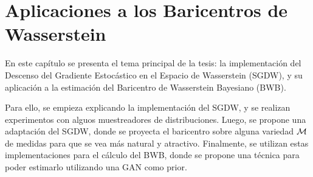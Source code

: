 \chapter{Aplicaciones a los Baricentros de Wasserstein}

En este capítulo se presenta el tema principal de la tesis: la implementación del Descenso del Gradiente Estocástico en el Espacio de Wasserstein (SGDW), y su aplicación a la estimación del Baricentro de Wasserstein Bayesiano (BWB).

Para ello, se empieza explicando la implementación del SGDW, y se realizan experimentos con alguos muestreadores de distribuciones. Luego, se propone una adaptación del SGDW, donde se proyecta el baricentro sobre alguna variedad $\operatorname{\mathcal{M}}$ de medidas para que se vea más natural y atractivo. Finalmente, se utilizan estas implementaciones para el cálculo del BWB, donde se propone una técnica para poder estimarlo utilizando una GAN como prior.



